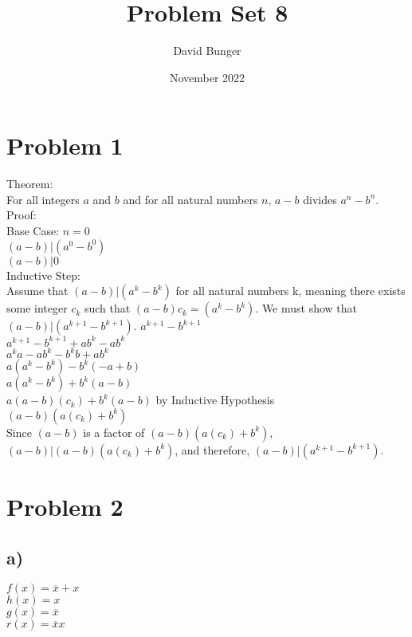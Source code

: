 \documentclass{article}
\title{Problem Set 8}
\author{David Bunger}
\date{November 2022}
\begin{document}
\maketitle

\section*{Problem 1}
Theorem:\\
For all integers $a$ and $b$ and for all natural numbers $n$, $a-b$ divides $a^n-b^n$.\\
Proof:\\
Base Case: $n=0$\\
$(a-b)|(a^0-b^0)$\\
$(a-b)|0$\\
Inductive Step:\\
Assume that $(a-b)|(a^k-b^k)$ for all natural numbers k, meaning there exists some integer $c_k$ such that $(a-b)c_k=(a^k-b^k)$. We must show that $(a-b)|(a^{k+1}-b^{k+1})$.
$a^{k+1}-b^{k+1}$\\
$a^{k+1}-b^{k+1}+ab^k-ab^k$\\
$a^{k}a-ab^k-b^{k}b+ab^k$\\
$a(a^k-b^k)-b^k(-a+b)$\\
$a(a^k-b^k)+b^k(a-b)$\\
$a(a-b)(c_k)+b^k(a-b)$ by Inductive Hypothesis\\
$(a-b)(a(c_k)+b^k)$\\
Since $(a-b)$ is a factor of $(a-b)(a(c_k)+b^k)$, $(a-b)|(a-b)(a(c_k)+b^k)$, and therefore, $(a-b)|(a^{k+1}-b^{k+1})$.
\clearpage
\section*{Problem 2}
\subsection*{a)}
$f(x)=\overline{x}+x$\\
$h(x)=x$\\
$g(x)=\overline{x}$\\
$r(x)=\overline{x}x$
\end{document}
